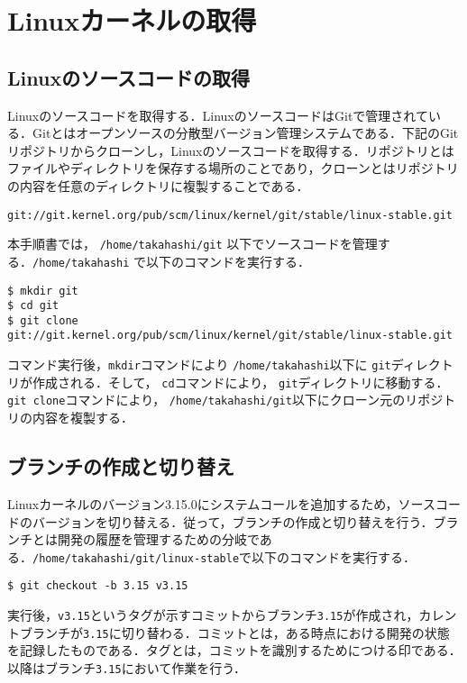 \documentclass[12pt]{jsarticle}
\begin{document}
\section{Linuxカーネルの取得}
\label{sec:getkernel}
\subsection{Linuxのソースコードの取得}
Linuxのソースコードを取得する．LinuxのソースコードはGitで管理されている．Gitとはオープンソースの分散型バージョン管理システムである．下記のGitリポジトリからクローンし，Linuxのソースコードを取得する．リポジトリとはファイルやディレクトリを保存する場所のことであり，クローンとはリポジトリの内容を任意のディレクトリに複製することである．

\begin{verbatim}
git://git.kernel.org/pub/scm/linux/kernel/git/stable/linux-stable.git
\end{verbatim}
本手順書では， \verb|/home/takahashi/git| 以下でソースコードを管理する．\verb|/home/takahashi| で以下のコマンドを実行する．

\begin{verbatim}
$ mkdir git
$ cd git
$ git clone git://git.kernel.org/pub/scm/linux/kernel/git/stable/linux-stable.git
\end{verbatim}
コマンド実行後，\verb|mkdir|コマンドにより \verb|/home/takahashi|以下に \verb|git|ディレクトリが作成される．そして， \verb|cd|コマンドにより， \verb|git|ディレクトリに移動する．\verb|git clone|コマンドにより， \verb|/home/takahashi/git|以下にクローン元のリポジトリの内容を複製する．

\subsection{ブランチの作成と切り替え}
Linuxカーネルのバージョン3.15.0にシステムコールを追加するため，ソースコードのバージョンを切り替える．従って，ブランチの作成と切り替えを行う．ブランチとは開発の履歴を管理するための分岐である．\verb|/home/takahashi/git/linux-stable|で以下のコマンドを実行する．

\begin{verbatim}
$ git checkout -b 3.15 v3.15
\end{verbatim}
実行後，\verb|v3.15|というタグが示すコミットからブランチ\verb|3.15|が作成され，カレントブランチが\verb|3.15|に切り替わる．コミットとは，ある時点における開発の状態を記録したものである．タグとは，コミットを識別するためにつける印である．以降はブランチ\verb|3.15|において作業を行う．
\end{document}
